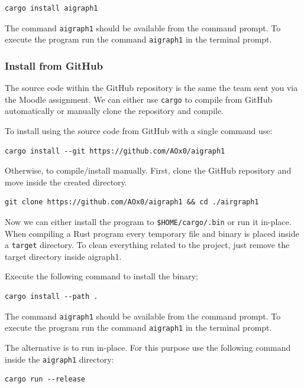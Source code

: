 \begin{verbatim}
cargo install aigraph1
\end{verbatim}

The command \texttt{aigraph1} should be available from the command prompt.
To execute the program run the command \texttt{aigraph1} in the terminal prompt.

\subsubsection{Install from GitHub}

The source code within the GitHub repository is the same the team sent you via the Moodle assignment.
We can either use \texttt{cargo} to compile from GitHub automatically or manually clone the repository and
compile.

To install using the source code from GitHub with a single command use:
\begin{verbatim}
cargo install --git https://github.com/AOx0/aigraph1
\end{verbatim}

Otherwise, to compile/install manually. First, clone the GitHub repository and move inside the created directory.

\begin{verbatim}
git clone https://github.com/AOx0/aigraph1 && cd ./airgraph1
\end{verbatim}

Now we can either install the program to \texttt{\$HOME/cargo/.bin} or run it in-place. When compiling a 
Rust program every temporary file and binary is placed inside a \texttt{target} directory. To clean everything
related to the project, just remove the target directory inside aigraph1.

Execute the following command to install the binary;

\begin{verbatim}
cargo install --path .
\end{verbatim}

The command \texttt{aigraph1} should be available from the command prompt.
To execute the program run the command \texttt{aigraph1} in the terminal prompt.

The alternative is to run in-place. For this purpose use the following command inside the \texttt{aigraph1} directory:

\begin{verbatim}
cargo run --release
\end{verbatim}

